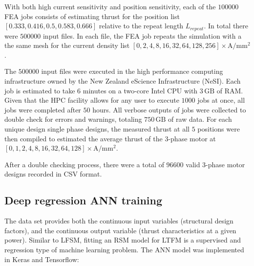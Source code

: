             
            With both high current sensitivity and position sensitivity, each of the $100000$ \acs{FEA} jobs consists of estimating thrust for the position list $[0.333,0.416,0.5,0.583,0.666]$ relative to the repeat length $L_{repeat}$. In total there were $500000$ input files. In each file, the \acs{FEA} job repeats the simulation with a the same mesh for the current density list $[0,2,4,8,16,32,64,128,256]\times\mathrm{A/mm^2}$. 
            
            
            The $500000$ input files were executed in the high performance computing infrastructure owned by the New Zealand eScience Infrastructure (NeSI). Each job is estimated to take $6$ minutes on a two-core Intel CPU with $3\,\mathrm{GB}$ of RAM. Given that the HPC facility allows for any user to execute $1000$ jobs at once, all jobs were completed after $50$ hours. All verbose outputs of jobs were collected to double check for errors and warnings, totaling $750\,\mathrm{GB}$ of raw data. For each unique design single phase designs, the measured thrust at all $5$ positions were then compiled to estimated the average thrust of the 3-phase motor at $[0,1,2,4,8,16,32,64,128]\times\mathrm{A/mm^2}$.
            
            
            After a double checking process, there were a total of $96600$ valid 3-phase motor designs recorded in CSV format. 
            
            
            
            
        \subsection{Deep regression ANN training}   \label{Chapter:RSM/LTFM/ANN training}
        
            
            The data set provides both the continuous input variables (structural design factors), and the continuous output variable (thrust characteristics at a given power). Similar to \acs{LFSM}, fitting an \acs{RSM} model for \acs{LTFM} is a supervised and regression type of machine learning problem. The \acs{ANN} model was implemented in Keras and Tensorflow:
            
